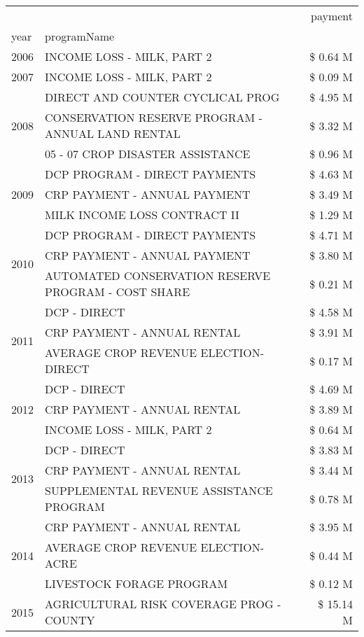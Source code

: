 \begin{tabular}{llr}
\toprule
 &  & payment \\
year & programName &  \\
\midrule
2006 & INCOME LOSS - MILK, PART 2 & \$ 0.64 M \\
\cline{1-3}
2007 & INCOME LOSS - MILK, PART 2 & \$ 0.09 M \\
\cline{1-3}
\multirow[t]{3}{*}{2008} & DIRECT AND COUNTER CYCLICAL PROG & \$ 4.95 M \\
 & CONSERVATION RESERVE PROGRAM - ANNUAL LAND RENTAL & \$ 3.32 M \\
 & 05 - 07 CROP DISASTER ASSISTANCE & \$ 0.96 M \\
\cline{1-3}
\multirow[t]{3}{*}{2009} & DCP PROGRAM - DIRECT PAYMENTS & \$ 4.63 M \\
 & CRP PAYMENT - ANNUAL PAYMENT & \$ 3.49 M \\
 & MILK INCOME LOSS CONTRACT II & \$ 1.29 M \\
\cline{1-3}
\multirow[t]{3}{*}{2010} & DCP PROGRAM - DIRECT PAYMENTS & \$ 4.71 M \\
 & CRP PAYMENT - ANNUAL PAYMENT & \$ 3.80 M \\
 & AUTOMATED CONSERVATION RESERVE PROGRAM - COST SHARE & \$ 0.21 M \\
\cline{1-3}
\multirow[t]{3}{*}{2011} & DCP - DIRECT & \$ 4.58 M \\
 & CRP PAYMENT - ANNUAL RENTAL & \$ 3.91 M \\
 & AVERAGE CROP REVENUE ELECTION-DIRECT & \$ 0.17 M \\
\cline{1-3}
\multirow[t]{3}{*}{2012} & DCP - DIRECT & \$ 4.69 M \\
 & CRP PAYMENT - ANNUAL RENTAL & \$ 3.89 M \\
 & INCOME LOSS - MILK, PART 2 & \$ 0.64 M \\
\cline{1-3}
\multirow[t]{3}{*}{2013} & DCP - DIRECT & \$ 3.83 M \\
 & CRP PAYMENT - ANNUAL RENTAL & \$ 3.44 M \\
 & SUPPLEMENTAL REVENUE ASSISTANCE PROGRAM & \$ 0.78 M \\
\cline{1-3}
\multirow[t]{3}{*}{2014} & CRP PAYMENT - ANNUAL RENTAL & \$ 3.95 M \\
 & AVERAGE CROP REVENUE ELECTION-ACRE & \$ 0.44 M \\
 & LIVESTOCK FORAGE PROGRAM & \$ 0.12 M \\
\cline{1-3}
\multirow[t]{3}{*}{2015} & AGRICULTURAL RISK COVERAGE PROG - COUNTY & \$ 15.14 M \\

\end{tabular}

